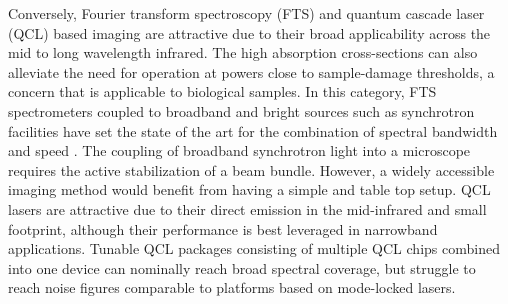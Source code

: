 \documentclass{optica-article}
\begin{document}
Conversely, Fourier transform spectroscopy (FTS) and quantum cascade laser (QCL) based imaging are attractive due to their broad applicability across the mid to long wavelength infrared. The high absorption cross-sections can also alleviate the need for operation at powers close to sample-damage thresholds, a concern that is applicable to biological samples. In this category, FTS spectrometers coupled to broadband and bright sources such as synchrotron facilities have set the state of the art for the combination of spectral bandwidth and speed \cite{nasseHighresolutionFouriertransformInfrared2011}. The coupling of broadband synchrotron light into a microscope requires the active stabilization of a beam bundle. However, a widely accessible imaging method would benefit from having a simple and table top setup. QCL lasers are attractive due to their direct emission in the mid-infrared and small footprint, although their performance is best leveraged in narrowband applications. Tunable QCL packages consisting of multiple QCL chips combined into one device \cite{yehFastInfraredChemical2015} can nominally reach broad spectral coverage, but struggle to reach noise figures comparable to platforms based on mode-locked lasers.



\end{document}

